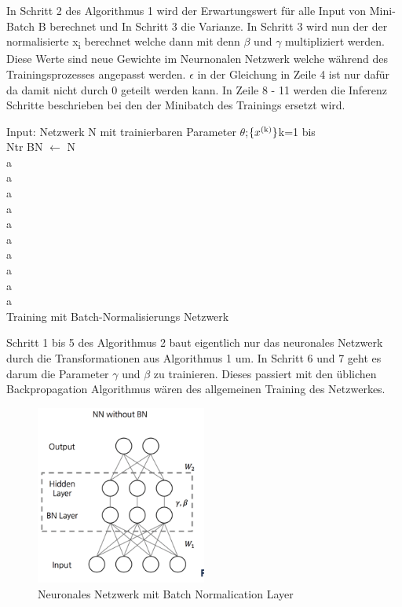 \documentclass{llncs}
\begin{document}
	In Schritt 2 des Algorithmus 1 wird der Erwartungswert für alle Input von Mini-Batch B berechnet und In Schritt 3 die Varianze. In Schritt 3 wird nun der der normalisierte x\textsubscript{i} berechnet welche dann mit denn $\beta$ und $\gamma$ multipliziert werden. Diese Werte sind neue Gewichte im Neurnonalen Netzwerk welche während des Trainingsprozesses angepasst werden. $\epsilon$ in der Gleichung in Zeile 4 ist nur dafür da damit nicht durch 0 geteilt werden kann. In Zeile 8 - 11 werden die Inferenz Schritte beschrieben bei den der Minibatch des Trainings ersetzt wird. 
	
	\begin{algorithm}[H]
		Input: Netzwerk N mit trainierbaren Parameter $\theta$;$\{x\textsuperscript{(k)}\}$k=1 bis 	
		\\	
		Ntr BN $\leftarrow$ N	
		\\a\\a\\a\\a\\a\\a\\a\\a\\a\\a\\
		
		\caption{Training mit Batch-Normalisierungs Netzwerk}	
	\end{algorithm}
	Schritt 1 bis 5 des Algorithmus 2 baut eigentlich nur das neuronales Netzwerk durch die Transformationen aus Algorithmus 1 um. In Schritt 6 und 7 geht es darum die Parameter $\gamma$ und $\beta$ zu trainieren. Dieses passiert mit den üblichen Backpropagation Algorithmus wären des allgemeinen Training des Netzwerkes. 
	
	\begin{figure}[htbp] 
		\centering
		\includegraphics[width=0.5\textwidth]{batchnorm.png}
		\caption[aaaa]{Neuronales Netzwerk mit Batch Normalication Layer}
		\label{fig:Bild1}
	\end{figure}
	
\end{document}
